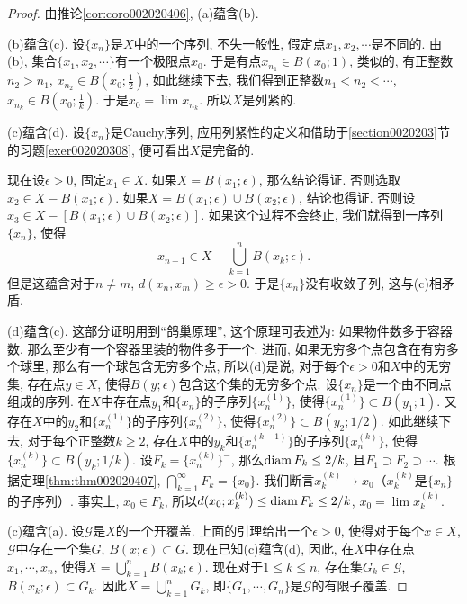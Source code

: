 \begin{proof}
由推论\ref{cor:coro002020406}, (a)蕴含(b). 

(b)蕴含(c). 设$\{x_n\}$是$X$中的一个序列, 不失一般性, 假定点$x_1,x_2,\cdots$是不同的. 由(b), 集合$\{x_1, x_2,\cdots\}$有一个极限点$x_0$. 于是有点$x_{n_1} \in B(x_0; 1)$, 类似的, 有正整数$n_2 > n_1$, $x_{n_2} \in B(x_0; \frac{1}{2})$, 如此继续下去, 我们得到正整数$n_1 < n_2 < \cdots$, $x_{n_k} \in B(x_0;\frac{1}{k})$. 于是$x_0 = \lim{x_{n_k}}$. 所以$X$是列紧的. 

(c)蕴含(d). 设$\{x_n\}$是Cauchy序列, 应用列紧性的定义和借助于\ref{section0020203}节的习题\ref{exer002020308}, 便可看出$X$是完备的. 

现在设$\epsilon > 0$, 固定$x_1 \in X$. 如果$X = B(x_1;\epsilon)$, 那么结论得证. 否则选取$x_2 \in X - B(x_1; \epsilon)$. 如果$X = B(x_1;\epsilon) \cup B(x_2;\epsilon)$, 结论也得证. 否则设$x_3 \in X - [B(x_1;\epsilon) \cup B(x_2;\epsilon)]$. 如果这个过程不会终止, 我们就得到一序列$\{x_n\}$, 使得
\[
x_{n+1} \in X - \bigcup_{k=1}^{n}{B(x_k; \epsilon)}.
\]
但是这蕴含对于$n \neq m$, $d(x_n, x_m) \ge \epsilon > 0$. 于是$\{x_n\}$没有收敛子列, 这与(c)相矛盾. 

(d)蕴含(c). 这部分证明用到“鸽巢原理”, 这个原理可表述为: 如果物件数多于容器数, 那么至少有一个容器里装的物件多于一个. 进而, 如果无穷多个点包含在有穷多个球里, 那么有一个球包含无穷多个点, 所以(d)是说, 对于每个$\epsilon > 0$和$X$中的无穷集, 存在点$y \in X$, 使得$B(y; \epsilon)$包含这个集的无穷多个点. 设$\{x_n\}$是一个由不同点组成的序列. 在$X$中存在点$y_1$和$\{x_n\}$的子序列$\{x_{n}^{(1)}\}$, 使得$\{x_n^{(1)}\} \subset B(y_1;1)$. 又存在$X$中的$y_2$和$\{x_n^{(1)}\}$的子序列$\{x_n^{(2)}\}$, 使得$\{x_n^{(2)}\} \subset B(y_2; 1/2)$. 如此继续下去, 对于每个正整数$k \ge 2$, 存在$X$中的$y_k$和$\{x_n^{(k-1)}\}$的子序列$\{x_n^{(k)}\}$, 使得$\{x_n^{(k)}\} \subset B(y_k; 1/k)$. 设$F_k = \{x_n^{(k)}\}^-$, 那么$\operatorname{diam}{F_k} \le 2/k$, 且$F_1 \supset F_2 \supset \cdots$. 根据定理\ref{thm:thm002020407}, $\bigcap_{k=1}^{\infty}{F_k} = \{x_0\}$. 我们断言$x_k^{(k)} \to x_0$（$x_k^{(k)}$是$\{x_n\}$的子序列）. 事实上, $x_0 \in F_k$, 所以$d(x_0;x_k^{(k)}) \le \operatorname{diam}{F_k} \le 2/k$, $x_0 = \lim{x_k^{(k)}}$. 

(c)蕴含(a). 设$\mathscr{G}$是$X$的一个开覆盖. 上面的引理给出一个$\epsilon > 0$, 使得对于每个$x \in X$, $\mathscr{G}$中存在一个集$G$, $B(x; \epsilon) \subset G$. 现在已知(c)蕴含(d), 因此, 在$X$中存在点$x_1, \cdots, x_n$, 使得$X = \bigcup_{k=1}^{n}{B(x_k;\epsilon)}$. 现在对于$1 \le k \le n$, 存在集$G_k \in \mathscr{G}$, $B(x_k;\epsilon) \subset G_k$. 因此$X = \bigcup_{k=1}^{n}{G_k}$, 即$\{G_1,\cdots, G_n\}$是$\mathscr{G}$的有限子覆盖. 
\end{proof}

